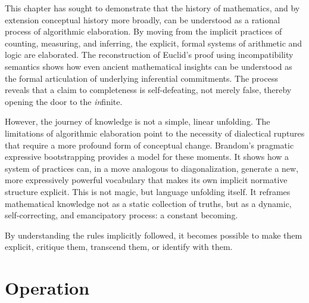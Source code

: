 \documentclass[12pt]{book}
\begin{document}
This chapter has sought to demonstrate that the history of mathematics, and by extension conceptual history more broadly, can be understood as a rational process of algorithmic elaboration. By moving from the implicit practices of counting, measuring, and inferring, the explicit, formal systems of arithmetic and logic are elaborated. The reconstruction of Euclid's proof using incompatibility semantics shows how even ancient mathematical insights can be understood as the formal articulation of underlying inferential commitments. The process reveals that a claim to completeness is self-defeating, not merely false, thereby opening the door to the \textit{in}finite.

However, the journey of knowledge is not a simple, linear unfolding. The limitations of algorithmic elaboration point to the necessity of dialectical ruptures that require a more profound form of conceptual change. Brandom's pragmatic expressive bootstrapping provides a model for these moments. It shows how a system of practices can, in a move analogous to diagonalization, generate a new, more expressively powerful vocabulary that makes its own implicit normative structure explicit. This is not magic, but language unfolding itself. It reframes mathematical knowledge not as a static collection of truths, but as a dynamic, self-correcting, and emancipatory process: a constant becoming. 


By understanding the rules implicitly followed, it becomes possible to make them explicit, critique them, transcend them, or identify with them. 

\printbibliography[heading=subbibliography]

\chapter{Operation}
\end{document}
